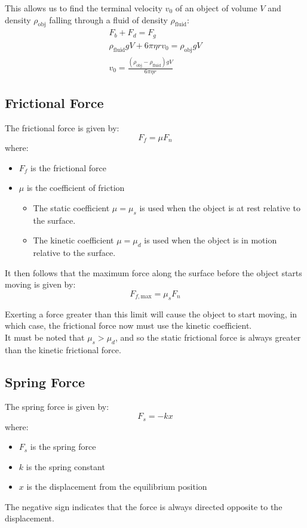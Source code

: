 \documentclass[a4paper,12pt]{article}
\newcommand{\lb}{\\[8pt]}
\begin{document}
This allows us to find the terminal velocity $v_0$ of an object of volume $V$ and density $\rho_\text{obj}$ falling through a fluid of density $\rho_\text{fluid}$:
\begin{align*}
  F_b + F_d = F_g                                               \\
  \rho_\text{fluid} g V + 6\pi \eta r v_0 = \rho_\text{obj} g V \\
  v_0 = \frac{\left(\rho_\text{obj} - \rho_\text{fluid}\right) g V}{6\pi \eta r}
\end{align*}


\pagebreak

\subsection{Frictional Force}

The frictional force is given by:
$$F_f = \mu F_n$$
where:
\begin{itemize}
  \item $F_f$ is the frictional force
  \item $\mu$ is the coefficient of friction
        \begin{itemize}
          \item The static coefficient $\mu = \mu_s$ is used when the object is at rest relative to the surface.
          \item The kinetic coefficient $\mu = \mu_d$ is used when the object is in motion relative to the surface.
        \end{itemize}
\end{itemize}

It then follows that the maximum force along the surface before the object starts moving is given by:
$$F_{f, \text{max}} = \mu_s F_n$$

Exerting a force greater than this limit will cause the object to start moving, in which case, the frictional force now must use the kinetic coefficient.\lb
It must be noted that $\mu_s > \mu_d$, and so the static frictional force is always greater than the kinetic frictional force.\lb

\pagebreak

\subsection{Spring Force}

The spring force is given by:
$$F_s = -kx$$
where:
\begin{itemize}
  \item $F_s$ is the spring force
  \item $k$ is the spring constant
  \item $x$ is the displacement from the equilibrium position
\end{itemize}
The negative sign indicates that the force is always directed opposite to the displacement.
\end{document}
